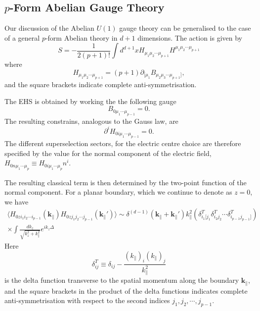 \subsection{$p$-Form Abelian Gauge Theory}
Our discussion of the Abelian $U(1)$ gauge theory can be generalised to the
case of a general $p$-form Abelian theory in $d+1$ dimensions. The action
is given by
\begin{equation}
  S = - \frac{1}{2(p+1)!}\int d^{d+1}x H_{\mu_1\mu_2\cdots\mu_{p+1}}H^{\mu_1\mu_2\cdots\mu_{p+1}}
\end{equation}
where
\begin{equation}
  H_{\mu_1\mu_2\cdots\mu_{p+1}}
  = (p+1)\partial_{[\mu_1}B_{\mu_2\mu_3\cdots\mu_{p+1}]},
\end{equation}
and the square brackets indicate complete anti-symmetrisation.
\par The EHS is obtained by working the the following gauge
\begin{equation}
  B_{0\mu_1\cdots\mu_{p-1}} = 0.
\end{equation}
The resulting constrains, analogous to the Gauss law, are
\begin{equation}
  \partial^i H_{0i\mu_1\cdots\mu_{p-1}} = 0.
\end{equation}
The different superselection sectors, for the electric centre choice are
therefore specified by the value for the normal component of the 
electric field, $H_{0n\mu_1\cdots\mu_p}\equiv H_{0i\mu_1\cdots\mu_p}n^i$.
\par The resulting classical term is then determined by the two-point 
function of the normal component. For a planar boundary, which we continue to
denote as $z=0$, we have
\begin{multline}
  \langle H_{0zi_1i_2\cdots i_{p-1}}(\mathbf{k}_{\|})H_{0zj_1j_2\cdots
    j_{p-1}}(\mathbf{k}_{\|}')\rangle\sim\delta^{(d-1)}(\mathbf{k}_{\|}+\mathbf{k}_{\|}')k^2_{\|}(\delta^T_{i_1[j_1}\delta^T_{i_2j_2}\cdots\delta^T_{i_{p-1}j_{p-1}]})\\
    \times\int\frac{dk_z}{\sqrt{k_z^2+k^2_{\|}}}e^{ik_z\Delta}
  \end{multline}
Here
\begin{equation}
  \delta^T_{ij}\equiv\delta_{ij} - \frac{(k_{\|})_i(k_{\|})_j}{k^2_{\|}}
\end{equation}
is the delta function transverse to the spatial momentum along the boundary
$\mathbf{k}_{\|}$, and the square brackets in the product of the delta
functions indicates complete anti-symmetrisation with respect to the
second indices $j_1,j_2,\cdots,j_{p-1}$.
